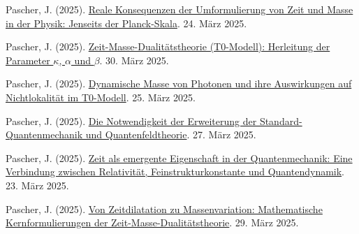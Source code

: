 \documentclass[a4paper,12pt]{article}
\begin{document}
	\begin{thebibliography}{99}
		
		 Pascher, J. (2025). \href{https://github.com/jpascher/T0-Time-Mass-Duality/tree/main/2/pdf/Deutsch/JenseitsPlanck.pdf}{Reale Konsequenzen der Umformulierung von Zeit und Masse in der Physik: Jenseits der Planck-Skala}. 24. März 2025.
		
		 Pascher, J. (2025). \href{https://github.com/jpascher/T0-Time-Mass-Duality/tree/main/2/pdf/Deutsch/ZeitMasseT0Params.pdf}{Zeit-Masse-Dualitätstheorie (T0-Modell): Herleitung der Parameter \(\kappa\), \(\alpha\) und \(\beta\)}. 30. März 2025.
		
		 Pascher, J. (2025). \href{https://github.com/jpascher/T0-Time-Mass-Duality/tree/main/2/pdf/Deutsch/DynMassePhotonenNichtlokal.pdf}{Dynamische Masse von Photonen und ihre Auswirkungen auf Nichtlokalität im T0-Modell}. 25. März 2025.
		
		 Pascher, J. (2025). \href{https://github.com/jpascher/T0-Time-Mass-Duality/tree/main/2/pdf/Deutsch/NotwendigkeitQMErweiterung.pdf}{Die Notwendigkeit der Erweiterung der Standard-Quantenmechanik und Quantenfeldtheorie}. 27. März 2025.
		
		 Pascher, J. (2025). \href{https://github.com/jpascher/T0-Time-Mass-Duality/tree/main/2/pdf/Deutsch/NatEinheitenAlpha1.pdf}{Zeit als emergente Eigenschaft in der Quantenmechanik: Eine Verbindung zwischen Relativität, Feinstrukturkonstante und Quantendynamik}. 23. März 2025.
		
		 Pascher, J. (2025). \href{https://github.com/jpascher/T0-Time-Mass-Duality/tree/main/2/pdf/Deutsch/MathZeitMasseLagrange.pdf}{Von Zeitdilatation zu Massenvariation: Mathematische Kernformulierungen der Zeit-Masse-Dualitätstheorie}. 29. März 2025.

		
	\end{thebibliography}
	
\end{document}
